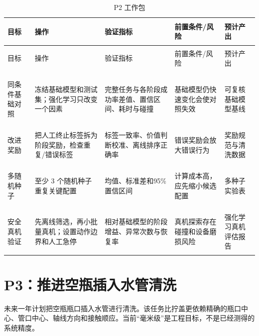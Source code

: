 \begingroup\small\setlength{\tabcolsep}{2pt}
\begin{longtable}{>{\bfseries\raggedright\arraybackslash}p{16mm}>{\raggedright\arraybackslash}p{25mm}>{\raggedright\arraybackslash}p{36mm}>{\raggedright\arraybackslash}p{31mm}>{\raggedright\arraybackslash}p{28mm}}
\caption{P2 工作包}\\
\toprule
目标 & 操作 & 验证指标 & 前置条件/风险 & 预计产出\\
\midrule\endfirsthead
\toprule
目标 & 操作 & 验证指标 & 前置条件/风险 & 预计产出\\
\midrule\endhead
同条件基础对照 &
冻结基础模型和测试集；强化学习只改变一个因素 &
完整任务与各阶段成功率差值、置信区间、耗时与碰撞 &
基础模型仍快速变化会使对照失效 &
可复核基础模型基线\\
\addlinespace
改进奖励 &
把人工终止标签拆为阶段奖励，检查重复/错误标签 &
标签一致率、价值判断校准、离线排序正确率 &
错误奖励会放大错误行为 &
奖励规范与清洗数据\\
\addlinespace
多随机种子 &
至少 3 个随机种子重复关键配置 &
均值、标准差和95\%置信区间 &
计算成本高，应先缩小候选配置 &
多种子实验表\\
\addlinespace
安全真机验证 &
先离线筛选，再小批量真机；设置动作边界和人工急停 &
相对基础模型的阶段增益、异常次数与恢复率 &
真机探索存在碰撞和设备磨损风险 &
强化学习真机评估报告\\
\bottomrule
\end{longtable}
\endgroup

\section{P3：推进空瓶插入水管清洗}

未来一年计划把空瓶瓶口插入水管进行清洗。该任务比拧盖更依赖精确的瓶口中心、管口中心、轴线方向和接触顺应。当前“毫米级”是工程目标，不是已经测得的系统精度。

